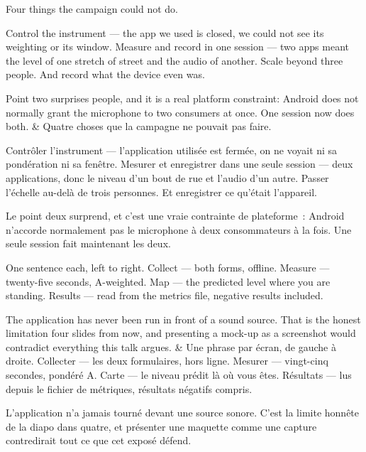 \documentclass[10pt,a4paper]{article}
\begin{document}
\begin{say}
Four things the campaign could not do.

Control the instrument --- the app we used is closed, we could not see its
weighting or its window. Measure and record in one session --- two apps meant the
level of one stretch of street and the audio of another. Scale beyond three
people. And record what the device even was.

Point two surprises people, and it is a real platform constraint: Android does not
normally grant the microphone to two consumers at once. One session now does both.
&
Quatre choses que la campagne ne pouvait pas faire.

Contrôler l'instrument --- l'application utilisée est fermée, on ne voyait ni sa
pondération ni sa fenêtre. Mesurer et enregistrer dans une seule session --- deux
applications, donc le niveau d'un bout de rue et l'audio d'un autre. Passer
l'échelle au-delà de trois personnes. Et enregistrer ce qu'était l'appareil.

Le point deux surprend, et c'est une vraie contrainte de plateforme~: Android
n'accorde normalement pas le microphone à deux consommateurs à la fois. Une seule
session fait maintenant les deux.
\end{say}

\begin{say}
One sentence each, left to right. Collect --- both forms, offline. Measure ---
twenty-five seconds, A-weighted. Map --- the predicted level where you are
standing. Results --- read from the metrics file, negative results included.

 The application has never been run in front of a sound
source. That is the honest limitation four slides from now, and presenting a
mock-up as a screenshot would contradict everything this talk argues.
&
Une phrase par écran, de gauche à droite. Collecter --- les deux formulaires, hors
ligne. Mesurer --- vingt-cinq secondes, pondéré A. Carte --- le niveau prédit là où
vous êtes. Résultats --- lus depuis le fichier de métriques, résultats négatifs
compris.

 L'application n'a jamais tourné devant une source
sonore. C'est la limite honnête de la diapo dans quatre, et présenter une maquette
comme une capture contredirait tout ce que cet exposé défend.
\end{say}
\end{document}
